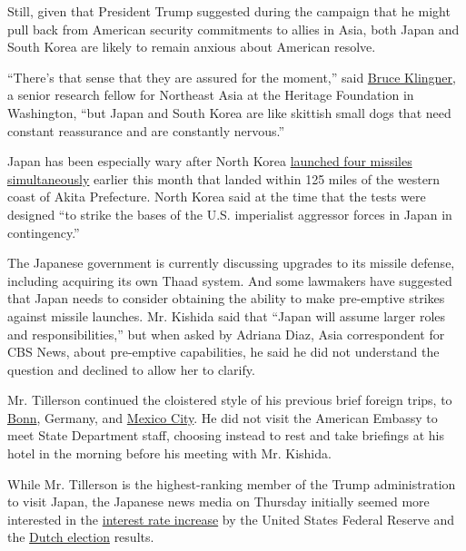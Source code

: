 Still, given that President Trump suggested during the campaign that he
might pull back from American security commitments to allies in Asia,
both Japan and South Korea are likely to remain anxious about American
resolve.

``There's that sense that they are assured for the moment,'' said
\href{http://www.heritage.org/staff/bruce-klingner}{Bruce Klingner}, a
senior research fellow for Northeast Asia at the Heritage Foundation in
Washington, ``but Japan and South Korea are like skittish small dogs
that need constant reassurance and are constantly nervous.''

Japan has been especially wary after North Korea
\href{https://www.nytimes3xbfgragh.onion/2017/03/06/world/asia/north-korea-missiles-japan.html}{launched
four missiles simultaneously} earlier this month that landed within 125
miles of the western coast of Akita Prefecture. North Korea said at the
time that the tests were designed ``to strike the bases of the U.S.
imperialist aggressor forces in Japan in contingency.''

The Japanese government is currently discussing upgrades to its missile
defense, including acquiring its own Thaad system. And some lawmakers
have suggested that Japan needs to consider obtaining the ability to
make pre-emptive strikes against missile launches. Mr. Kishida said that
``Japan will assume larger roles and responsibilities,'' but when asked
by Adriana Diaz, Asia correspondent for CBS News, about pre-emptive
capabilities, he said he did not understand the question and declined to
allow her to clarify.

Mr. Tillerson continued the cloistered style of his previous brief
foreign trips, to
\href{https://www.nytimes3xbfgragh.onion/2017/02/15/world/europe/germany-rex-tillerson.html}{Bonn},
Germany, and
\href{https://www.nytimes3xbfgragh.onion/2017/02/22/world/americas/rex-tillerson-mexico-border-relations.html}{Mexico
City}. He did not visit the American Embassy to meet State Department
staff, choosing instead to rest and take briefings at his hotel in the
morning before his meeting with Mr. Kishida.

While Mr. Tillerson is the highest-ranking member of the Trump
administration to visit Japan, the Japanese news media on Thursday
initially seemed more interested in the
\href{https://www.nytimes3xbfgragh.onion/2017/03/15/business/economy/fed-interest-rates-yellen.html?hp\&action=click\&pgtype=Homepage\&clickSource=story-heading\&module=first-column-region\&region=top-news\&WT.nav=top-news}{interest
rate increase} by the United States Federal Reserve and the
\href{https://www.nytimes3xbfgragh.onion/2017/03/15/world/europe/geert-wilders-netherlands-far-right-vote.html?hp\&action=click\&pgtype=Homepage\&clickSource=story-heading\&module=second-column-region\&region=top-news\&WT.nav=top-news}{Dutch
election} results.

